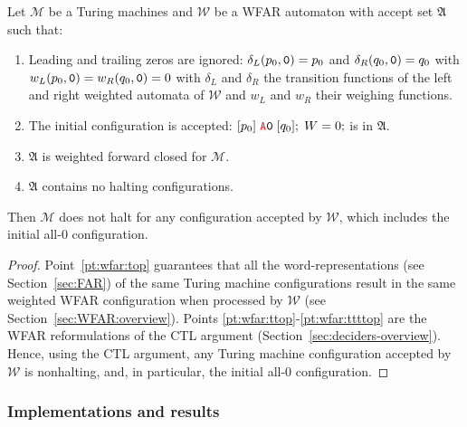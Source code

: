 \begin{theorem}\label{th:WFAR}
    Let $\mathcal{M}$ be a Turing machines and $\mathcal{W}$ be a WFAR automaton with accept set $\mathfrak{A}$ such that:
    \begin{enumerate}
        \item Leading and trailing zeros are ignored: $\delta_L(p_0,\texttt{0}) = p_0$ and $\delta_R(q_0,\texttt{0}) = q_0$ with $w_L(p_0,\texttt{0}) = w_R(q_0,\texttt{0}) = 0$ with $\delta_L$ and $\delta_R$ the transition functions of the left and right weighted automata of $\mathcal{W}$ and $w_L$ and $w_R$ their weighing functions.\label{pt:wfar:top}
        \item The initial configuration is accepted: \ie $[p_0]\; \texttt{\stateA}\szero\; [q_0];\; W=0;$ is in $\mathfrak{A}$.\label{pt:wfar:ttop}
        \item $\mathfrak{A}$ is weighted forward closed for $\mathcal{M}$.\label{pt:wfar:tttop}
        \item $\mathfrak{A}$ contains no halting configurations.\label{pt:wfar:ttttop}
    \end{enumerate}

    Then $\mathcal{M}$ does not halt for any configuration accepted by $\mathcal{W}$, which includes the initial all-0 configuration.
\end{theorem}
\begin{proof}
    Point~\ref{pt:wfar:top} guarantees that all the word-representations (see Section~\ref{sec:FAR}) of the same Turing machine configurations result in the same weighted WFAR configuration when processed by $\mathcal{W}$ (see Section~\ref{sec:WFAR:overview}). Points \ref{pt:wfar:ttop}-\ref{pt:wfar:ttttop} are the WFAR reformulations of the CTL argument (Section~\ref{sec:deciders-overview}). Hence, using the CTL argument, any Turing machine configuration accepted by $\mathcal{W}$ is nonhalting, and, in particular, the initial all-0 configuration.
\end{proof}





\subsubsection{Implementations and results}\label{sec:WFAR:results}